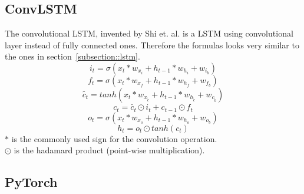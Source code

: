  \subsection{ConvLSTM} \label{subsection::convlstm}
  The convolutional LSTM, invented by Shi et. al. \cite{Shi2015} is a LSTM using convolutional layer instead of fully connected ones. Therefore the formulas looks very similar to the ones in    
  section~\ref{subsection::lstm}.
  \begin{equation}
   i_t = \sigma(x_t \ast w_{x_i} + h_{t-1} \ast w_{h_i} + w_{i_b})
  \end{equation}
  \begin{equation}
   f_t = \sigma(x_t \ast w_{x_f} + h_{t-1} \ast w_{h_f} + w_{f_b})
  \end{equation}
  \begin{equation}
   \tilde{c_t} = tanh(x_t \ast w_{x_{\tilde{c}}} + h_{t-1} \ast w_{h_{\tilde{c}}} + w_{c_{\tilde{b}}})
  \end{equation}
  \begin{equation}
   c_t = \tilde{c_t} \odot i_t + c_{t-1} \odot f_t
  \end{equation}
  \begin{equation}
   o_t = \sigma(x_t \ast w_{x_o} + h_{t-1} \ast w_{h_o} + w_{o_b})
  \end{equation}
  \begin{equation}
   h_t = o_t \odot tanh(c_t)
  \end{equation}
  $\ast$ is the commonly used sign for the convolution operation.\\
  $\odot$ is the hadamard product (point-wise multiplication).
  
 \subsection{PyTorch} \label{subsection::pytorch}